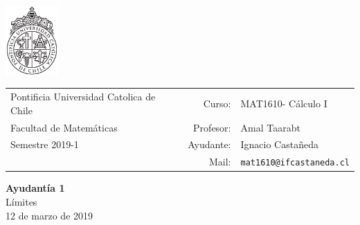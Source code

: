 \documentclass[12pt]{article}
\makeatletter
\newcommand{\ayudantia}{{\sc Ayudantía 1}}
\newcommand{\tituloayu}{Límites}
\newcommand{\fecha}{12 de marzo de 2019}
\newcommand{\sigla}{MAT1610}
\newcommand{\nombre}{Cálculo I}
\newcommand{\profesor}{Amal Taarabt}
\newcommand{\ano}{2019}
\newcommand{\semestre}{1}
\newcommand{\mail}{mat1610@ifcastaneda.cl}
\makeatother
\begin{document}
\thispagestyle{empty}

\begin{minipage}{2cm}
	\includegraphics[width=2cm]{../../../../img/logo.pdf}
	\vspace{0.5cm}
\end{minipage}
\begin{minipage}{\linewidth}
	\begin{tabular}{lrl}
		{\scriptsize\sc Pontificia Universidad Catolica de Chile} & \hspace*{0.7in}Curso: &
		\sigla  - \nombre\\
		{\sc Facultad de Matemáticas}&
		Profesor: & \profesor \\
		{\sc Semestre \ano-\semestre} & Ayudante: & {Ignacio Castañeda}\\
		& {Mail:} & \texttt{\mail}
	\end{tabular}
\end{minipage}

\vspace{-10mm}
\begin{center}
	{\LARGE\bf \ayudantia}\\
	\vspace{0.1cm}
	{\tituloayu}\\
	\vspace{0.1cm}
	\fecha\\
	\vspace{0.4cm}
\end{center}
\end{document}
